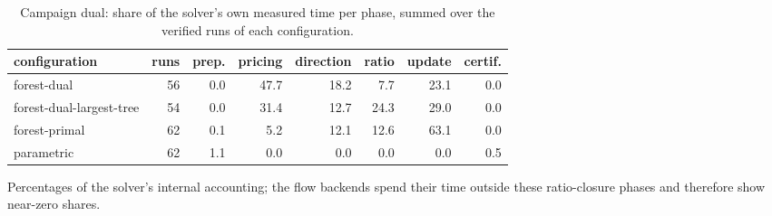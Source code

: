 \begin{table}[tbp]
\centering
\caption{Campaign dual: share of the solver's own measured time per phase, summed over the verified runs of each configuration.}
\label{tab:dual-breakdown}
\small
\begin{adjustbox}{max width=\textwidth}
\begin{tabular}{lrrrrrrr}
\toprule
configuration & runs & prep. & pricing & direction & ratio & update & certif. \\
\midrule
forest-dual & 56 & 0.0 & 47.7 & 18.2 & 7.7 & 23.1 & 0.0 \\
forest-dual-largest-tree & 54 & 0.0 & 31.4 & 12.7 & 24.3 & 29.0 & 0.0 \\
forest-primal & 62 & 0.1 & 5.2 & 12.1 & 12.6 & 63.1 & 0.0 \\
parametric & 62 & 1.1 & 0.0 & 0.0 & 0.0 & 0.0 & 0.5 \\
\bottomrule
\end{tabular}
\end{adjustbox}
\par\vspace{2pt}\footnotesize Percentages of the solver's internal accounting; the flow backends spend their time outside these ratio-closure phases and therefore show near-zero shares.
\end{table}

